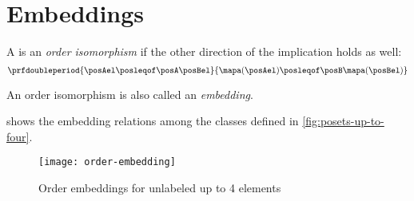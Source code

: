 \section{Embeddings}

\begin{ctdefinition}
    \label{def:order-isomorphism}
    A  is an \emph{order isomorphism} if the other direction of the implication holds as well:
    \begin{equation}
        \prfdoubleperiod{
            \posAel \posleqof\posA \posBel
        }{
            \mapa(\posAel) \posleqof\posB \mapa(\posBel)
        }
    \end{equation}
\end{ctdefinition}

An order isomorphism is also called an \emph{embedding}.

 shows the embedding relations among the  classes defined in \cref{fig:posets-up-to-four}.

\begin{figure*}
    \texttt{[image: order-embedding]}
    \caption{Order embeddings for unlabeled  up to 4 elements}
    \label{fig:order-embedding}
\end{figure*}
